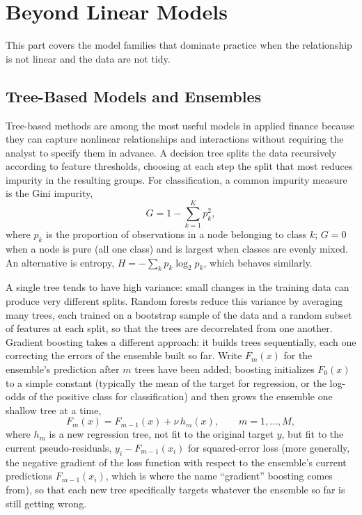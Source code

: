 \documentclass[../ai_in_finance]{subfiles}
\begin{document}
\section{Beyond Linear Models}

This part covers the model families that dominate practice when the relationship is not linear and the data are not tidy.

\subsection{Tree-Based Models and Ensembles}
\label{sec:tree-models}

Tree-based methods are among the most useful models in applied finance because they can capture nonlinear relationships and interactions without requiring the analyst to specify them in advance. A decision tree splits the data recursively according to feature thresholds, choosing at each step the split that most reduces impurity in the resulting groups. For classification, a common impurity measure is the Gini impurity,
\begin{equation*}
G = 1 - \sum_{k=1}^K p_k^2,
\end{equation*}
where $p_k$ is the proportion of observations in a node belonging to class $k$; $G=0$ when a node is pure (all one class) and is largest when classes are evenly mixed. An alternative is entropy, $H = -\sum_k p_k \log_2 p_k$, which behaves similarly.

A single tree tends to have high variance: small changes in the training data can produce very different splits. Random forests reduce this variance by averaging many trees, each trained on a bootstrap sample of the data and a random subset of features at each split, so that the trees are decorrelated from one another. Gradient boosting takes a different approach: it builds trees sequentially, each one correcting the errors of the ensemble built so far. Write $F_m(x)$ for the ensemble's prediction after $m$ trees have been added; boosting initializes $F_0(x)$ to a simple constant (typically the mean of the target for regression, or the log-odds of the positive class for classification) and then grows the ensemble one shallow tree at a time,
\begin{equation*}
F_m(x) = F_{m-1}(x) + \nu \, h_m(x), \qquad m = 1, \dots, M,
\end{equation*}
where $h_m$ is a new regression tree, not fit to the original target $y$, but fit to the current pseudo-residuals, $y_i - F_{m-1}(x_i)$ for squared-error loss (more generally, the negative gradient of the loss function with respect to the ensemble's current predictions $F_{m-1}(x_i)$, which is where the name ``gradient'' boosting comes from), so that each new tree specifically targets whatever the ensemble so far is still getting wrong.
\end{document}
